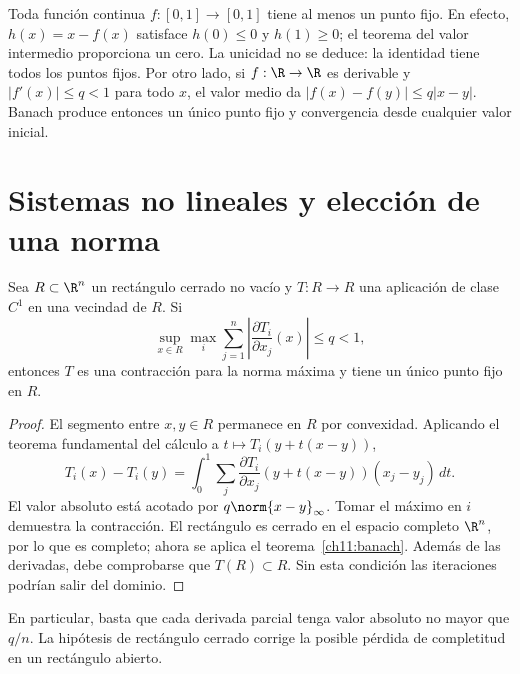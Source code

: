 \begin{ejemplo}
Toda función continua $f:[0,1]\to[0,1]$ tiene al menos un punto fijo. En efecto, $h(x)=x-f(x)$ satisface $h(0)\leq0$ y $h(1)\geq0$; el teorema del valor intermedio proporciona un cero. La unicidad no se deduce: la identidad tiene todos los puntos fijos. Por otro lado, si $f:\R\to\R$ es derivable y $|f'(x)|\leq q<1$ para todo $x$, el valor medio da $|f(x)-f(y)|\leq q|x-y|$. Banach produce entonces un único punto fijo y convergencia desde cualquier valor inicial.
\end{ejemplo}

\section{Sistemas no lineales y elección de una norma}
\begin{proposicion}\label{ch11:jacobiano}
Sea $R\subset\R^n$ un rectángulo cerrado no vacío y $T:R\to R$ una aplicación de clase $C^1$ en una vecindad de $R$. Si
\[
 \sup_{x\in R}\max_i\sum_{j=1}^n
 \left|\frac{\partial T_i}{\partial x_j}(x)\right|\leq q<1,
\]
entonces $T$ es una contracción para la norma máxima y tiene un único punto fijo en $R$.
\end{proposicion}
\begin{proof}
El segmento entre $x,y\in R$ permanece en $R$ por convexidad. Aplicando el teorema fundamental del cálculo a $t\mapsto T_i(y+t(x-y))$,
\[
 T_i(x)-T_i(y)=\int_0^1\sum_j
 \frac{\partial T_i}{\partial x_j}(y+t(x-y))(x_j-y_j)\,dt.
\]
El valor absoluto está acotado por $q\norm{x-y}_\infty$. Tomar el máximo en $i$ demuestra la contracción. El rectángulo es cerrado en el espacio completo $\R^n$, por lo que es completo; ahora se aplica el teorema~\ref{ch11:banach}. Además de las derivadas, debe comprobarse que $T(R)\subset R$. Sin esta condición las iteraciones podrían salir del dominio.
\end{proof}
En particular, basta que cada derivada parcial tenga valor absoluto no mayor que $q/n$. La hipótesis de rectángulo cerrado corrige la posible pérdida de completitud en un rectángulo abierto.

